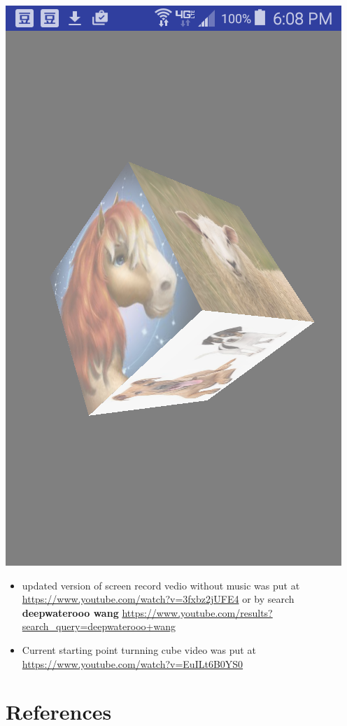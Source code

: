 \documentclass[9pt,b5paper]{article}
\begin{document}
\includegraphics[width=.9\linewidth]{./Screenshot_2016-05-06-18-08-06.png}
\begin{itemize}
\item updated version of screen record vedio without music was put at \url{https://www.youtube.com/watch?v=3fxbz2jUFE4} or by search \textbf{deepwaterooo wang} \url{https://www.youtube.com/results?search_query=deepwaterooo+wang}
\item Current starting point turnning cube video was put at \url{https://www.youtube.com/watch?v=EuILt6B0YS0}
\end{itemize}

\section{References}
\label{sec-2}
\end{document}
